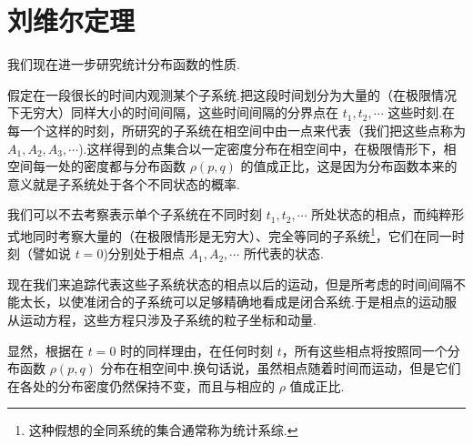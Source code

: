 \section{刘维尔定理}

我们现在进一步研究统计分布函数的性质.

假定在一段很长的时间内观测某个子系统.把这段时间划分为大量的（在极限情况下无穷大）同样大小的时间间隔，这些时间间隔的分界点在 $t_1,t_2,\cdots$ 这些时刻.在每一个这样的时刻，所研究的子系统在相空间中由一点来代表（我们把这些点称为 $A_1,A_2,A_3,\cdots$).这样得到的点集合以一定密度分布在相空间中，在极限情形下，相空间每一处的密度都与分布函数 $\rho(p,q)$ 的值成正比，这是因为分布函数本来的意义就是子系统处于各个不同状态的概率.

我们可以不去考察表示单个子系统在不同时刻 $t_1,t_2,\cdots$ 所处状态的相点，而纯粹形式地同时考察大量的（在极限情形是无穷大）、完全等同的子系统\footnote{这种假想的全同系统的集合通常称为统计系综.}，它们在同一时刻（譬如说 $t=0$)分别处于相点 $A_1,A_2,\cdots$ 所代表的状态.

现在我们来追踪代表这些子系统状态的相点以后的运动，但是所考虑的时间间隔不能太长，以使准闭合的子系统可以足够精确地看成是闭合系统.于是相点的运动服从运动方程，这些方程只涉及子系统的粒子坐标和动量.

显然，根据在 $t=0$ 时的同样理由，在任何时刻 $t$，所有这些相点将按照同一个分布函数 $\rho(p,q)$ 分布在相空间中.换句话说，虽然相点随着时间而运动，但是它们在各处的分布密度仍然保持不变，而且与相应的 $\rho$ 值成正比.

